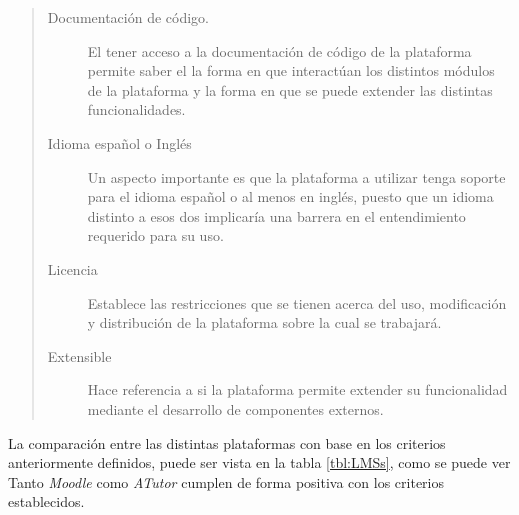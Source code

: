     \begin{quote}
    \begin{description}
    \item[Documentación de código.] El tener acceso a la documentación de código de
            la plataforma permite saber el la forma en que interactúan los distintos
            módulos de la plataforma y la forma en que se puede extender las distintas
            funcionalidades.

    \item[Idioma español o Inglés] Un aspecto importante es que la plataforma a utilizar
            tenga soporte para el idioma español o al menos en inglés, puesto que un
            idioma distinto a esos dos implicaría una barrera en el entendimiento requerido
            para su uso.

    \item[Licencia] Establece las restricciones que se tienen acerca del uso, modificación
            y distribución de la plataforma sobre la cual se trabajará.

    \item[Extensible] Hace referencia a si la plataforma permite extender su funcionalidad
            mediante el desarrollo de componentes externos.
    \end{description}
    \end{quote}

 \noindent La comparación entre las distintas plataformas con base en los criterios
 anteriormente definidos, puede ser vista en la tabla \ref{tbl:LMSs}, como se puede
 ver Tanto {\it Moodle} como {\it ATutor} cumplen de forma positiva con los criterios
 establecidos.

 \clearpage



